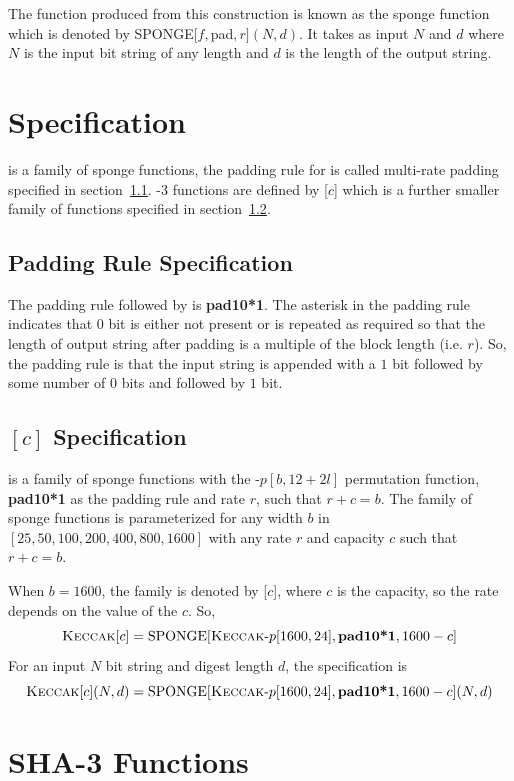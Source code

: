 The function produced from this construction is known as the sponge function which is denoted by SPONGE$[f, $pad$, r](N, d)$. It takes as input $N$ and $d$ where $N$ is the input bit string of any length and $d$ is the length of the output string.

\section{\KECCAK{} Specification}

\KECCAK{} is a family of sponge functions, the padding rule for \KECCAK{} is called multi-rate padding specified in section~\ref{padding}. \SHA-$3$ functions are defined by \KECCAK{}[$c$] which is a further smaller family of \KECCAK{} functions specified in section~\ref{keccakc}.

\subsection{Padding Rule Specification}
\label{padding}

The padding rule followed by \KECCAK{} is \textbf{pad10*1}. The asterisk in the padding rule indicates that $0$ bit is either not present or is repeated as required so that the length of output string after padding is a multiple of the block length (i.e. $r$). So, the padding rule is that the input string is appended with a $1$ bit followed by some number of $0$ bits and followed by $1$ bit.

\subsection{\KECCAK{}$[c]$ Specification}
\label{keccakc}

\KECCAK{} is a family of sponge functions with the \KECCAK{}-$p[b, 12 + 2l]$ permutation function, \textbf{pad10*1} as the padding rule and rate $r$, such that $r + c = b$. The family of sponge functions is parameterized for any width $b$ in $[25, 50,100,200,400,800,1600]$ with any rate $r$ and capacity $c$ such that $r + c = b$.

When $b = 1600$, the \KECCAK{} family is denoted by \KECCAK{}[$c$], where $c$ is the capacity, so the rate depends on the value of the $c$. So, 
\[\mbox{\textsc{Keccak}}{}[c] = \text{SPONGE}[\mbox{\textsc{Keccak}}{}\text{-}p[1600, 24], \textbf{pad10*1}, 1600-c]\]
For an input $N$ bit string and digest length $d$, the specification is 
\[\mbox{\textsc{Keccak}}{}[c](N, d) = \text{SPONGE}[\mbox{\textsc{Keccak}}{}\text{-}p[1600, 24], \textbf{pad10*1}, 1600-c](N, d)\]
\section{SHA-3 Functions}

